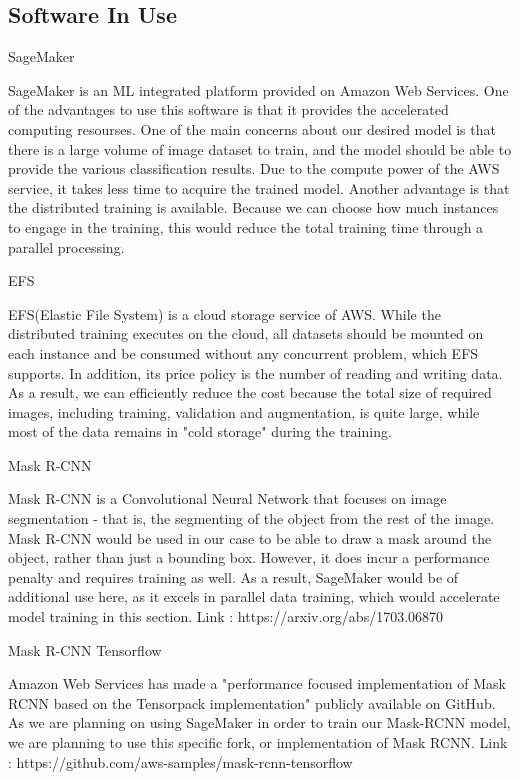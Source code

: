 \documentclass[conference]{IEEEtran}
\begin{document}
\subsection{Software In Use}

\begin{center}
SageMaker
\end{center}
SageMaker is an ML integrated platform provided on Amazon Web Services. One of the advantages to use this software is that it provides the accelerated computing resourses. One of the main concerns about our desired model is that there is a large volume of image dataset to train, and the model should be able to provide the various classification results. Due to the compute power of the AWS service, it takes less time to acquire the trained model.
Another advantage is that the distributed training is available. Because we can choose how much instances to engage in the training, this would reduce the total training time through a parallel processing.
\newline
\begin{center}
EFS
\end{center}
EFS(Elastic File System) is a cloud storage service of AWS. While the distributed training executes on the cloud, all datasets should be mounted on each instance and be consumed without any concurrent problem, which EFS supports. In addition, its price policy is the number of reading and writing data. As a result, we can efficiently reduce the cost because the total size of required images, including training, validation and augmentation, is quite large, while most of the data remains in "cold storage" during the training.
\newline
\begin{center}
Mask R-CNN
\end{center}
Mask R-CNN is a Convolutional Neural Network that focuses on image segmentation - that is, the segmenting of the object from the rest of the image. Mask R-CNN would be used in our case to be able to draw a mask around the object, rather than just a bounding box. However, it does incur a performance penalty and requires training as well. As a result, SageMaker would be of additional use here, as it excels in parallel data training, which would accelerate model training in this section.
\newline
Link : https://arxiv.org/abs/1703.06870
\newline
\begin{center}
Mask R-CNN Tensorflow
\end{center}
Amazon Web Services has made a "performance focused implementation of Mask RCNN based on the Tensorpack implementation" publicly available on GitHub. As we are planning on using SageMaker in order to train our Mask-RCNN model, we are planning to use this specific fork, or implementation of Mask RCNN. 
\newline
Link : https://github.com/aws-samples/mask-rcnn-tensorflow
\end{document}
